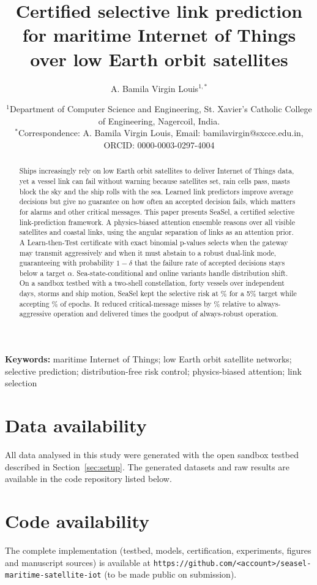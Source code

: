 \documentclass[11pt]{article}
\title{\textbf{Certified selective link prediction for maritime Internet of Things over low Earth orbit satellites}}
\author{A. Bamila Virgin Louis$^{1,*}$}
\date{\small $^{1}$Department of Computer Science and Engineering, St. Xavier's Catholic College of Engineering, Nagercoil, India.\\
$^{*}$Correspondence: A. Bamila Virgin Louis, Email: bamilavirgin@sxcce.edu.in, ORCID: 0000-0003-0297-4004}
\begin{document}
\maketitle

\begin{abstract}
\noindent Ships increasingly rely on low Earth orbit satellites to deliver Internet of Things data, yet a vessel link can fail without warning because satellites set, rain cells pass, masts block the sky and the ship rolls with the sea. Learned link predictors improve average decisions but give no guarantee on how often an accepted decision fails, which matters for alarms and other critical messages. This paper presents SeaSel, a certified selective link-prediction framework. A physics-biased attention ensemble reasons over all visible satellites and coastal links, using the angular separation of links as an attention prior. A Learn-then-Test certificate with exact binomial p-values selects when the gateway may transmit aggressively and when it must abstain to a robust dual-link mode, guaranteeing with probability $1-\delta$ that the failure rate of accepted decisions stays below a target $\alpha$. Sea-state-conditional and online variants handle distribution shift. On a sandbox testbed with a two-shell constellation, forty vessels over independent days, storms and ship motion, SeaSel kept the selective risk at \RSRisk\% for a 5\% target while accepting \RSCov\% of epochs. It reduced critical-message misses by \RMissRed\% relative to always-aggressive operation and delivered \RGoodRatio{} times the goodput of always-robust operation.
\end{abstract}

\noindent\textbf{Keywords:} maritime Internet of Things; low Earth orbit satellite networks; selective prediction; distribution-free risk control; physics-biased attention; link selection





\section*{Data availability}
All data analysed in this study were generated with the open sandbox testbed described in Section~\ref{sec:setup}. The generated datasets and raw results are available in the code repository listed below.

\section*{Code availability}
The complete implementation (testbed, models, certification, experiments, figures and manuscript sources) is available at \texttt{https://github.com/<account>/seasel-maritime-satellite-iot} (to be made public on submission).
\end{document}
